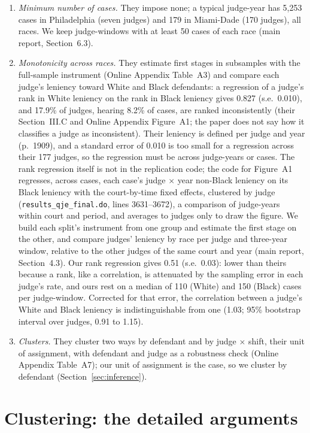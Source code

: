 \documentclass[11pt]{article}
\begin{document}
\begin{enumerate}
  \item \emph{Minimum number of cases.} They impose none; a typical judge-year has 5,253 cases in Philadelphia (seven judges) and 179 in Miami-Dade (170 judges), all races. We keep judge-windows with at least 50 cases of each race (main report, Section~6.3).
  \item \emph{Monotonicity across races.} They estimate first stages in subsamples with the full-sample instrument (Online Appendix Table~A3) and compare each judge's leniency toward White and Black defendants: a regression of a judge's rank in White leniency on the rank in Black leniency gives 0.827 (s.e.\ 0.010), and 17.9\% of judges, hearing 8.2\% of cases, are ranked inconsistently (their Section~III.C and Online Appendix Figure~A1; the paper does not say how it classifies a judge as inconsistent). Their leniency is defined per judge and year (p.~1909), and a standard error of 0.010 is too small for a regression across their 177 judges, so the regression must be across judge-years or cases. The rank regression itself is not in the replication code; the code for Figure~A1 regresses, across cases, each case's judge $\times$ year non-Black leniency on its Black leniency with the court-by-time fixed effects, clustered by judge (\texttt{results\_qje\_final.do}, lines 3631--3672), a comparison of judge-years within court and period, and averages to judges only to draw the figure. We build each split's instrument from one group and estimate the first stage on the other, and compare judges' leniency by race per judge and three-year window, relative to the other judges of the same court and year (main report, Section~4.3). Our rank regression gives 0.51 (s.e.\ 0.03): lower than theirs because a rank, like a correlation, is attenuated by the sampling error in each judge's rate, and ours rest on a median of 110 (White) and 150 (Black) cases per judge-window. Corrected for that error, the correlation between a judge's White and Black leniency is indistinguishable from one (1.03; 95\% bootstrap interval over judges, 0.91 to 1.15).
  \item \emph{Clusters.} They cluster two ways by defendant and by judge $\times$ shift, their unit of assignment, with defendant and judge as a robustness check (Online Appendix Table~A7); our unit of assignment is the case, so we cluster by defendant (Section~\ref{sec:inference}).
\end{enumerate}

\clearpage
\appendix
\section{Clustering: the detailed arguments}\label{sec:cluster_details}
\end{document}
